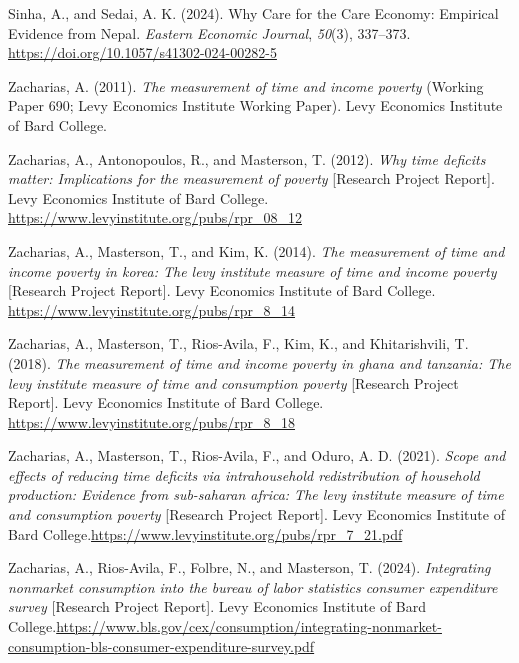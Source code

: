 \documentclass[
  11pt,
]{article}
\newlength{\cslhangindent}
\newenvironment{CSLReferences}[2] %
 {\begin{list}{}{%
  \setlength{\itemindent}{0pt}
  \setlength{\leftmargin}{0pt}
  \setlength{\parsep}{0pt}
  \ifodd #1
   \setlength{\leftmargin}{\cslhangindent}
   \setlength{\itemindent}{-1\cslhangindent}
  \fi
  \setlength{\itemsep}{#2\baselineskip}}}
 {\end{list}}
\begin{document}
\begin{CSLReferences}{1}{0}
Sinha, A., and Sedai, A. K. (2024). Why {Care} for the {Care} {Economy}:
{Empirical} {Evidence} from {Nepal}. \emph{Eastern Economic Journal},
\emph{50}(3), 337--373. \url{https://doi.org/10.1057/s41302-024-00282-5}

Zacharias, A. (2011). \emph{The measurement of time and income poverty}
(Working Paper 690; Levy Economics Institute Working Paper). Levy
Economics Institute of Bard College.

Zacharias, A., Antonopoulos, R., and Masterson, T. (2012). \emph{Why
time deficits matter: Implications for the measurement of poverty}
{[}Research Project Report{]}. Levy Economics Institute of Bard College.
\url{https://www.levyinstitute.org/pubs/rpr_08_12}

Zacharias, A., Masterson, T., and Kim, K. (2014). \emph{The measurement
of time and income poverty in korea: The levy institute measure of time
and income poverty} {[}Research Project Report{]}. Levy Economics
Institute of Bard College.
\url{https://www.levyinstitute.org/pubs/rpr_8_14}

Zacharias, A., Masterson, T., Rios-Avila, F., Kim, K., and
Khitarishvili, T. (2018). \emph{The measurement of time and income
poverty in ghana and tanzania: The levy institute measure of time and
consumption poverty} {[}Research Project Report{]}. Levy Economics
Institute of Bard College.
\url{https://www.levyinstitute.org/pubs/rpr_8_18}

Zacharias, A., Masterson, T., Rios-Avila, F., and Oduro, A. D. (2021).
\emph{Scope and effects of reducing time deficits via intrahousehold
redistribution of household production: Evidence from sub-saharan
africa: The levy institute measure of time and consumption poverty}
{[}Research Project Report{]}. Levy Economics Institute of Bard
College.\href{\%20https://www.levyinstitute.org/pubs/rpr_7_21.pdf}{https://www.levyinstitute.org/pubs/rpr\_7\_21.pdf}

Zacharias, A., Rios-Avila, F., Folbre, N., and Masterson, T. (2024).
\emph{Integrating nonmarket consumption into the bureau of labor
statistics consumer expenditure survey} {[}Research Project Report{]}.
Levy Economics Institute of Bard
College.\href{\%20https://www.bls.gov/cex/consumption/integrating-nonmarket-consumption-bls-consumer-expenditure-survey.pdf}{https://www.bls.gov/cex/consumption/integrating-nonmarket-consumption-bls-consumer-expenditure-survey.pdf}

\end{CSLReferences}
\end{document}
